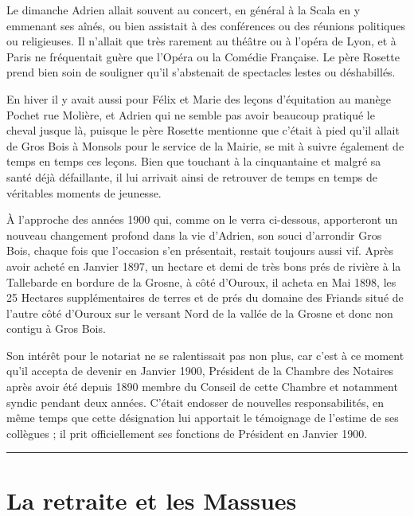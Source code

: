 \documentclass[11pt,a4paper]{report}
\begin{document}

Le dimanche Adrien allait souvent au concert, en général à la Scala en y emmenant ses aînés, ou bien assistait à des conférences ou des réunions politiques ou religieuses. Il n'allait que très rarement au théâtre ou à l'opéra de Lyon, et à Paris ne fréquentait guère que l'Opéra ou la Comédie Française. Le père Rosette prend bien soin de souligner qu'il s'abstenait de spectacles lestes ou déshabillés.

En hiver il y avait aussi pour Félix et Marie des leçons d'équitation au manège Pochet rue Molière, et Adrien qui ne semble pas avoir beaucoup pratiqué le cheval jusque là, puisque le père Rosette mentionne que c'était à pied qu'il allait de Gros Bois à Monsols pour le service de la Mairie, se mit à suivre également de temps en temps ces leçons. Bien que touchant à la cinquantaine et malgré sa santé déjà défaillante, il lui arrivait ainsi de retrouver de temps en temps de véritables moments de jeunesse.

À l'approche des années 1900 qui, comme on le verra ci-dessous, apporteront un nouveau changement profond dans la vie d'Adrien, son souci d'arrondir Gros Bois, chaque fois que l'occasion s'en présentait, restait toujours aussi vif. Après avoir acheté en Janvier 1897, un hectare et demi de très bons prés de rivière à la Tallebarde en bordure de la Grosne, à côté d'Ouroux, il acheta en Mai 1898, les 25 Hectares supplémentaires de terres et de prés du domaine des Friands situé de l'autre côté d'Ouroux sur le versant Nord de la vallée de la Grosne et donc non contigu à Gros Bois.

Son intérêt pour le notariat ne se ralentissait pas non plus, car c'est à ce moment qu'il accepta de devenir en Janvier 1900, Président de la Chambre des Notaires après avoir été depuis 1890 membre du Conseil de cette Chambre et notamment syndic pendant deux années. C'était endosser de nouvelles responsabilités, en même temps que cette désignation lui apportait le témoignage de l'estime de ses collègues ; il prit officiellement ses fonctions de Président en Janvier 1900.

\begin{center}\rule{0.5\linewidth}{0.5pt}\end{center}


\chapter{La retraite et les Massues}\label{la-retraite-et-les-massues}
\end{document}
